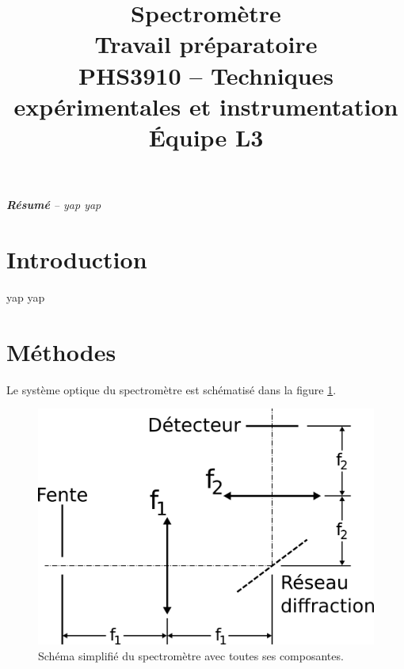 \documentclass[conference]{IEEEtran}
\begin{document}
\title{Spectromètre\\
\large Travail préparatoire \\
PHS3910 -- Techniques expérimentales et instrumentation\\ 
Équipe L3}

\author{
\and
{}
\and
{}
\and
{}
}

\maketitle

\textit{\textbf{Résumé} -- yap yap}

\section{Introduction}
yap yap

\section{Méthodes \label{methodes}}

Le système optique du spectromètre est schématisé dans la figure \ref{4f}.

\begin{figure}[H]
    \centering
    \includegraphics[scale=0.4]{4f.png}
    \caption{Schéma simplifié du spectromètre avec toutes ses composantes. \label{4f}}
\end{figure}
\end{document}
